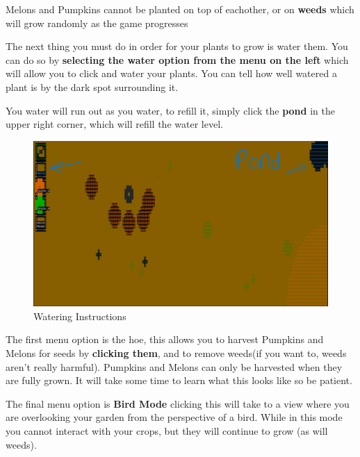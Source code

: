 \documentclass{article}
\begin{document}
Melons and Pumpkins cannot be planted on top of eachother, or on \textbf{weeds} which will grow randomly as the game progresses

The next thing you must do in order for your plants to grow is water them. You can do so by \textbf{selecting the water option from the menu on the left} which will allow you to click and water your plants. You can tell how well watered a plant is by the dark spot surrounding it. 

You water will run out as you water, to refill it, simply click the \textbf{pond} in the upper right corner, which will refill the water level.

    \begin{figure}[H]
    \includegraphics[width=\textwidth]{watering.png }
    \caption{Watering Instructions}
        
    \end{figure}

The first menu option is the hoe, this allows you to harvest Pumpkins and Melons for seeds by \textbf{clicking them}, and to remove weeds(if you want to, weeds aren't really harmful). Pumpkins and Melons can only be harvested when they are fully grown. It will take some time to learn what this looks like so be patient.

The final menu option is \textbf{Bird Mode} clicking this will take to a view where you are overlooking your garden from the perspective of a bird. While in this mode you cannot interact with your crops, but they will continue to grow (as will weeds).
\end{document}
